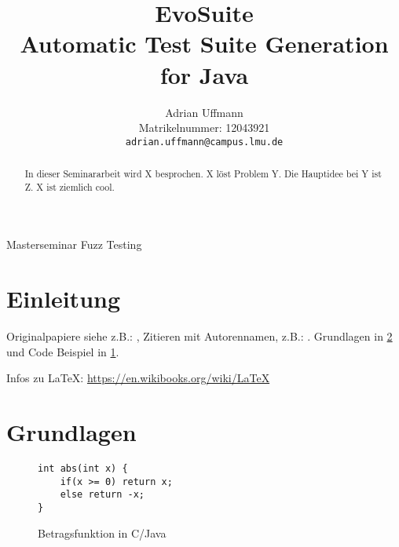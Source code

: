\documentclass[a4paper,11pt]{article}
\author{Adrian Uffmann\\Matrikelnummer: 12043921\\\texttt{adrian.uffmann@campus.lmu.de}}
\title{\textbf{EvoSuite}\\Automatic Test Suite Generation for Java}
\begin{document}
\maketitle

\begin{center}
Masterseminar Fuzz Testing
\end{center}

\begin{abstract}
In dieser Seminararbeit wird X besprochen.
X löst Problem Y. Die Hauptidee bei Y ist Z.
X ist ziemlich cool.
\end{abstract}

\section{Einleitung}
\label{sec:intro}

Originalpapiere siehe z.B.: \cite{TSE12_EvoSuite,10.1109/32.57624,emse14_mutation},
Zitieren mit Autorennamen, z.B.: \citet{TSE12_EvoSuite}.
Grundlagen in \cref{sec:background} und Code Beispiel in \cref{fig:abs}.

Infos zu \LaTeX: \url{https://en.wikibooks.org/wiki/LaTeX}

\section{Grundlagen}
\label{sec:background}

\begin{figure}
\centering
\begin{verbatim}
int abs(int x) {
    if(x >= 0) return x;
    else return -x;
}
\end{verbatim}
\caption{Betragsfunktion in C/Java}
\label{fig:abs}
\end{figure}



\end{document}
